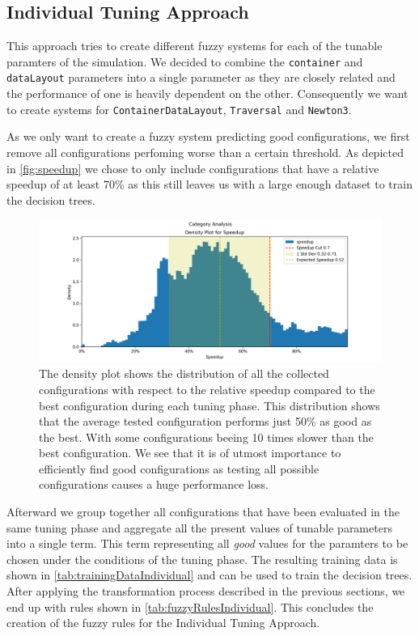 \subsection{Individual Tuning Approach}

This approach tries to create different fuzzy systems for each of the tunable paramters of the simulation. We decided to combine the \texttt{container} and \texttt{dataLayout} parameters into a single parameter as they are closely related and the performance of one is heavily dependent on the other. Consequently we want to create systems for \texttt{ContainerDataLayout}, \texttt{Traversal} and \texttt{Newton3}.

As we only want to create a fuzzy system predicting good configurations, we first remove all configurations perfoming worse than a certain threshold. As depicted in \autoref{fig:speedup} we chose to only include configurations that have a relative speedup of at least 70\% as this still leaves us with a large enough dataset to train the decision trees.

\begin{figure}[H]
    \centering
    \includegraphics[width=\columnwidth,trim={1cm 0 2cm 1.5cm},clip]{figures/DataAnalytics/speedup.png}
    \caption[Speedup density plot of all configurations]{The density plot shows the distribution of all the collected configurations with respect to the relative speedup compared to the best configuration during each tuning phase. This distribution shows that the average tested configuration performs just 50\% as good as the best. With some configurations beeing 10 times slower than the best configuration.
        We see that it is of utmost importance to efficiently find good configurations as testing all possible configurations causes a huge performance loss.}
    \label{fig:speedup}
\end{figure}

Afterward we group together all configurations that have been evaluated in the same tuning phase and aggregate all the present values of tunable parameters into a single term. This term representing all \emph{good} values for the paramters to be chosen under the conditions of the tuning phase. The resulting training data is shown in \autoref{tab:trainingDataIndividual} and can be used to train the decision trees. After applying the transformation process described in the previous sections, we end up with rules shown in \autoref{tab:fuzzyRulesIndividual}. This concludes the creation of the fuzzy rules for the Individual Tuning Approach.


